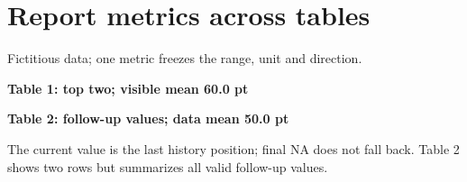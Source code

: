 \documentclass{article}\usepackage[T1]{fontenc}\usepackage{lmodern}
\begin{document}
\section*{Report metrics across tables}
Fictitious data; one metric freezes the range, unit and direction.\par
\medskip
{}\quad
{}\par\medskip
{}\par\medskip
{}\par\medskip
\textbf{Table 1: top two; visible mean 60.0 pt}\par
\begin{gradtable}[data=reviews,style=metric-report,width=\linewidth,
 sort=score,order=descending,limit=2]
\end{gradtable}\par\medskip
\textbf{Table 2: follow-up values; data mean 50.0 pt}\par
\begin{gradtable}[data=reviews,style=metric-report,width=\linewidth,
 limit=2]
\end{gradtable}\par
The current value is the last history position; final NA does not fall back. Table 2 shows two rows but summarizes all valid follow-up values.
\end{document}
